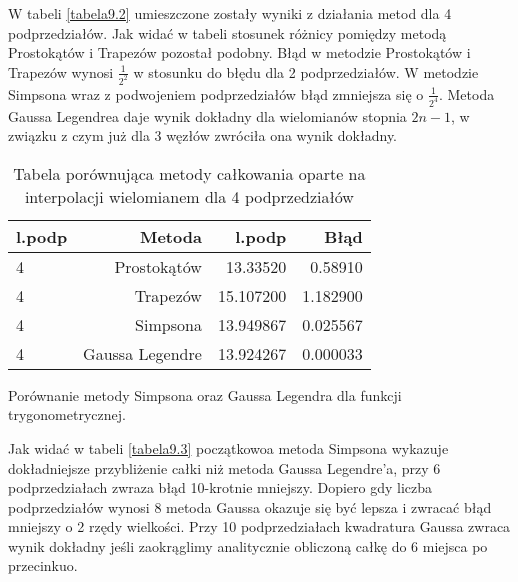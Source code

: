 \documentclass[12pt,twoside]{article}
\begin{document}
W tabeli \eqref{tabela9.2} umieszczone zostały wyniki z działania metod dla 4 podprzedziałów.
Jak widać w tabeli stosunek różnicy pomiędzy metodą Prostokątów i Trapezów pozostał podobny.
Błąd w metodzie Prostokątów i Trapezów wynosi $\frac{1}{2^2}$ w stosunku do błędu dla 2 podprzedziałów.
W metodzie Simpsona wraz z podwojeniem podprzedziałów błąd zmniejsza się o $\frac{1}{2^4}$.
Metoda Gaussa Legendrea daje wynik dokładny dla wielomianów stopnia $2n-1$, w związku z czym już dla 3 węzłów zwróciła ona wynik dokładny.


\begin{table}[h]
\centering 
\caption{Tabela porównująca metody całkowania oparte na interpolacji wielomianem dla 4 podprzedziałów }
\label{tabela9.2}
\begin{tabular}{lrrr}
\toprule
{l.podp} & Metoda &  l.podp &  Błąd \\
\midrule
4  &     Prostokątów & 13.33520 &   0.58910  \\
4  &     Trapezów & 15.107200 &  1.182900  \\
4  &     Simpsona & 13.949867 &   0.025567  \\
4  &     Gaussa Legendre & 13.924267 &  0.000033  \\
\bottomrule
\end{tabular}
\end{table}


Porównanie metody Simpsona oraz Gaussa Legendra dla funkcji trygonometrycznej.

Jak widać w tabeli \eqref{tabela9.3} początkowoa metoda Simpsona wykazuje dokładniejsze przybliżenie całki niż metoda Gaussa Legendre'a, przy 6 podprzedziałach zwraza błąd 10-krotnie mniejszy. Dopiero gdy liczba podprzedziałów wynosi 8 metoda Gaussa okazuje się być lepsza i zwracać błąd mniejszy o 2 rzędy wielkości. 
Przy 10 podprzedziałach kwadratura Gaussa zwraca wynik dokładny jeśli zaokrąglimy analitycznie obliczoną całkę do 6 miejsca po przecinkuo.
\end{document}
